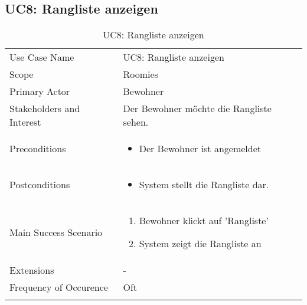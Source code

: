 \subsection{UC8: Rangliste anzeigen}
\begin{table}[H]
	\tablestyle
	\tablealtcolored
	\begin{tabularx}{\textwidth}{lX}
		\tablebody
			Use Case Name &
			UC8: Rangliste anzeigen
			\tabularnewline
			Scope &
			Roomies
			\tabularnewline
			Primary Actor &
			Bewohner
			\tabularnewline
			Stakeholders and Interest &
			Der Bewohner möchte die Rangliste sehen.
			\tabularnewline
			Preconditions &
			\begin{itemize}
				\item Der Bewohner ist angemeldet
			\end{itemize}
			\tabularnewline
			Postconditions &
			\begin{itemize}
				\item System stellt die Rangliste dar.
			\end{itemize}
			\tabularnewline
			Main Success Scenario &
			\begin{enumerate}
				\item Bewohner klickt auf 'Rangliste'
				\item System zeigt die Rangliste an
			\end{enumerate}
			\tabularnewline
			Extensions &
			-
			\tabularnewline
			Frequency of Occurence &
			Oft
			\tabularnewline
		\tableend
	\end{tabularx}
	\caption{UC8: Rangliste anzeigen}
\end{table}